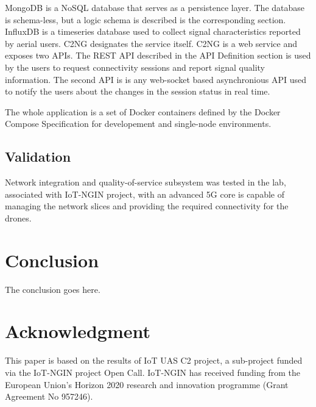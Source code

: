 \documentclass[a4paper,conference]{IEEEtran}
\begin{document}
MongoDB is a NoSQL database that serves as a persistence layer. The database is schema-less, but a logic schema is described is the corresponding section. InfluxDB is a timeseries database used to collect signal characteristics reported by aerial users. C2NG designates the service itself. C2NG is a web service and exposes two APIs. The REST API described in the API Definition section is used by the users to request connectivity sessions and report signal quality information. The second API is is any web-socket based asynchronious API used to notify the users about the changes in the session status in real time.

The whole application is a set of Docker containers defined by the Docker Compose Specification for developement and single-node environments.

\subsection{Validation}

Network integration and quality-of-service subsystem was tested in the lab, associated with IoT-NGIN project, with an advanced 5G core is capable of managing the network slices and providing the required connectivity for the drones.

\section{Conclusion}
The conclusion goes here.

\section*{Acknowledgment}

This paper is based on the results of IoT UAS C2 project, a sub-project funded via the IoT-NGIN project Open Call. IoT-NGIN has received funding from the European Union’s Horizon 2020 research and innovation programme (Grant Agreement No 957246).

%
%
%
\end{document}

